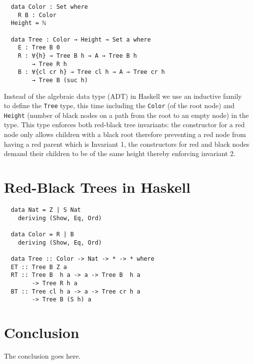 \documentclass[journal, retainorgcmds]{../IEEEtemplate/IEEEtran}
\newcommand{\iagda}[1]{\texttt{#1}}
\begin{document}
\begin{verbatim}
  data Color : Set where
    R B : Color
  Height = ℕ

  data Tree : Color → Height → Set a where
    E : Tree B 0
    R : ∀{h} → Tree B h → A → Tree B h
        → Tree R h
    B : ∀{cl cr h} → Tree cl h → A → Tree cr h
        → Tree B (suc h)
\end{verbatim}

Instead of the algebraic data type (ADT) \cite{adt} in Haskell we use an
inductive family \cite{indfam} to define the \iagda{Tree} type, this time
including the \iagda{Color} (of the root node) and \iagda{Height} (number of
black nodes on a path from the root to an empty node) in the type.
This type enforces both red-black tree invariants: the constructor for a
red node only allows children with a black root therefore preventing a red
node from having a red parent which is Invariant 1, the constructors for red
and black nodes demand their children to be of the same height thereby
enforcing invariant 2.



\section{Red-Black Trees in Haskell}

\begin{verbatim}
  data Nat = Z | S Nat
    deriving (Show, Eq, Ord)

  data Color = R | B
    deriving (Show, Eq, Ord)

  data Tree :: Color -> Nat -> * -> * where
  ET :: Tree B Z a
  RT :: Tree B  h a -> a -> Tree B  h a
        -> Tree R h a
  BT :: Tree cl h a -> a -> Tree cr h a
        -> Tree B (S h) a
\end{verbatim}


\section{Conclusion}
The conclusion goes here.

\end{document}
